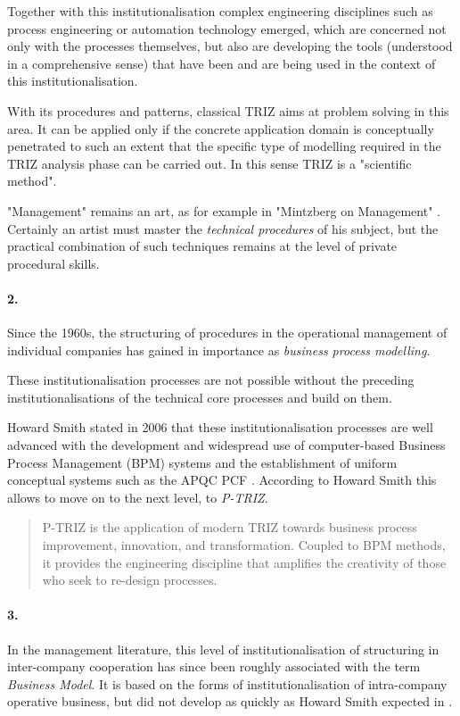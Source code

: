 \documentclass[11pt,a4paper]{article}
\begin{document}
Together with this institutionalisation complex engineering disciplines such
as process engineering or automation technology emerged, which are concerned
not only with the processes themselves, but also are developing the tools
(understood in a comprehensive sense) that have been and are being used in the
context of this institutionalisation.

With its procedures and patterns, classical TRIZ aims at problem solving in
this area. It can be applied only if the concrete application domain is
conceptually penetrated to such an extent that the specific type of modelling
required in the TRIZ analysis phase can be carried out.  In this sense TRIZ is
a "scientific method".

"Management" remains an art, as for example in "Mintzberg on Management"
\cite{Mintzberg}. Certainly an artist must master the \emph{technical
  procedures} of his subject, but the practical combination of such techniques
remains at the level of private procedural skills.

\paragraph{2.}
Since the 1960s, the structuring of procedures in the operational management
of individual companies has gained in importance as \emph{business process
  modelling}.

These institutionalisation processes are not possible without the preceding
institutionalisations of the technical core processes and build on them.

Howard Smith \cite{Smith2006} stated in 2006 that these institutionalisation
processes are well advanced with the development and widespread use of
computer-based Business Process Management (BPM) systems and the establishment
of uniform conceptual systems such as the APQC PCF \cite{APQC}. According to
Howard Smith this allows to move on to the next level, to \emph{P-TRIZ}.
\begin{quote}
  P-TRIZ is the application of modern TRIZ towards business process
  improvement, innovation, and transformation. Coupled to BPM methods, it
  provides the engineering discipline that amplifies the creativity of those
  who seek to re-design processes. \cite{Smith2006}
\end{quote}
  
\paragraph{3.}
In the management literature, this level of institutionalisation of
structuring in inter-company cooperation has since been roughly associated
with the term \emph{Business Model}. It is based on the forms of
institutionalisation of intra-company operative business, but did not develop
as quickly as Howard Smith expected in \cite{Smith2006}.
\end{document}
